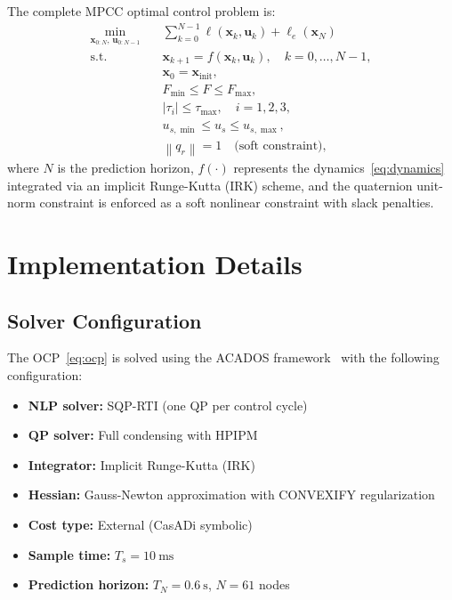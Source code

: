 \documentclass[journal]{IEEEtran}
\newcommand{\norm}[1]{\left\| #1 \right\|}
\begin{document}
The complete MPCC optimal control problem is:
\begin{subequations}
\label{eq:ocp}
\begin{align}
    \min_{\bm{x}_{0:N},\, \bm{u}_{0:N-1}} &\quad \sum_{k=0}^{N-1} \ell(\bm{x}_k, \bm{u}_k) + \ell_e(\bm{x}_N) \\
    \text{s.t.} &\quad \bm{x}_{k+1} = f(\bm{x}_k, \bm{u}_k), \quad k = 0, \ldots, N{-}1, \\
    &\quad \bm{x}_0 = \bm{x}_{\text{init}}, \\
    &\quad F_{\min} \leq F \leq F_{\max}, \\
    &\quad |\tau_i| \leq \tau_{\max}, \quad i = 1, 2, 3, \\
    &\quad u_{s,\min} \leq u_s \leq u_{s,\max}, \\
    &\quad \norm{q_r} = 1 \quad \text{(soft constraint)},
\end{align}
\end{subequations}
where $N$ is the prediction horizon, $f(\cdot)$ represents the dynamics~\eqref{eq:dynamics} integrated via an implicit Runge-Kutta (IRK) scheme, and the quaternion unit-norm constraint is enforced as a soft nonlinear constraint with slack penalties.

\section{Implementation Details}

\subsection{Solver Configuration}

The OCP~\eqref{eq:ocp} is solved using the ACADOS framework~\cite{verschueren2021acados} with the following configuration:

\begin{itemize}
    \item \textbf{NLP solver:} SQP-RTI (one QP per control cycle)
    \item \textbf{QP solver:} Full condensing with HPIPM
    \item \textbf{Integrator:} Implicit Runge-Kutta (IRK)
    \item \textbf{Hessian:} Gauss-Newton approximation with CONVEXIFY regularization
    \item \textbf{Cost type:} External (CasADi symbolic)
    \item \textbf{Sample time:} $T_s = \SI{10}{\milli\second}$
    \item \textbf{Prediction horizon:} $T_N = \SI{0.6}{\second}$, $N = 61$ nodes
\end{itemize}
\end{document}
